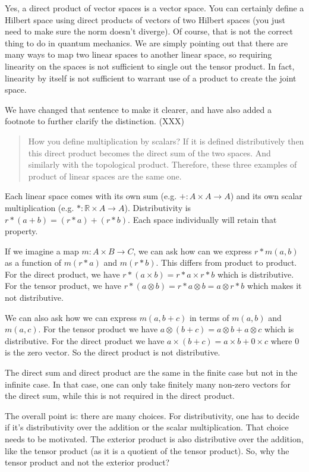 \documentclass[11pt]{article}
\begin{document}
Yes, a direct product of vector spaces is a vector space. You can
certainly define a Hilbert space using direct products of vectors of
two Hilbert spaces (you just need to make sure the norm doesn't
diverge). Of course, that is not the correct thing to do in quantum
mechanics. We are simply pointing out that there are many ways to map
two linear spaces to another linear space, so requiring linearity on
the spaces is not sufficient to single out the tensor product. In
fact, linearity by itself is not sufficient to warrant use of a
product to create the joint space.

We have changed that sentence to make it clearer, and have also added
a footnote to further clarify the distinction. (XXX)

\begin{quote}
How you define multiplication by scalars? If it is defined
distributively then this direct product becomes the direct sum of the
two spaces. And similarly with the topological product. Therefore,
these three examples of product of linear spaces are the same one.
\end{quote}

Each linear space comes with its own sum (e.g. $+ : A \times A \to A$)
and its own scalar multiplication (e.g. $* : \mathbb{R} \times A \to
A$). Distributivity is $r * (a + b) = (r*a) + (r*b)$. Each space
individually will retain that property.

If we imagine a map $m : A \times B \to C$, we can ask how can we
express $r*m(a,b)$ as a function of $m(r*a)$ and $m(r*b)$. This
differs from product to product. For the direct product, we have $r *
(a \times b) = r*a \times r*b$ which is distributive. For the tensor
product, we have $r * (a \otimes b) = r*a \otimes b = a \otimes r*b$
which makes it not distributive.

We can also ask how we can express $m(a,b+c)$ in terms of $m(a,b)$ and
$m(a,c)$. For the tensor product we have $a \otimes (b+c) = a \otimes
b + a \otimes c$ which is distributive. For the direct product we have
$a \times (b+c) = a \times b + 0 \times c$ where $0$ is the zero
vector. So the direct product is not distributive.

The direct sum and direct product are the same in the finite case but
not in the infinite case. In that case, one can only take finitely
many non-zero vectors for the direct sum, while this is not required
in the direct product.

The overall point is: there are many choices. For distributivity, one
has to decide if it's distributivity over the addition or the scalar
multiplication. That choice needs to be motivated. The exterior
product is also distributive over the addition, like the tensor
product (as it is a quotient of the tensor product). So, why the
tensor product and not the exterior product?
\end{document}
